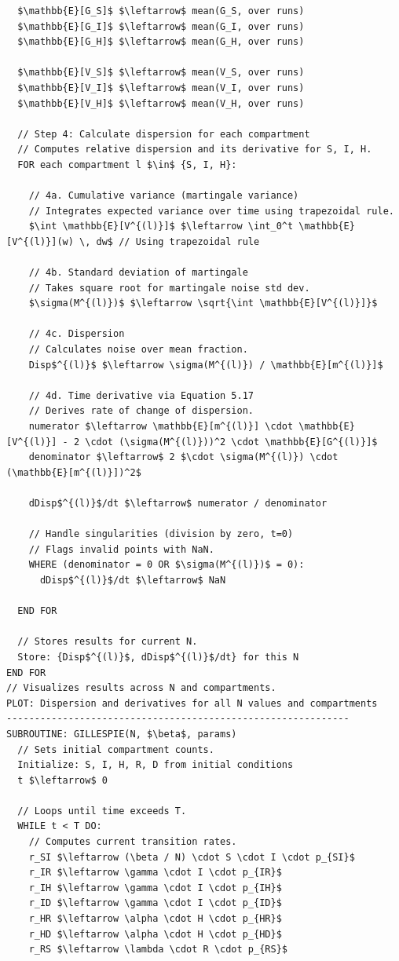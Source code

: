 \documentclass{article}
\begin{document}
\begin{lstlisting}
  $\mathbb{E}[G_S]$ $\leftarrow$ mean(G_S, over runs)
  $\mathbb{E}[G_I]$ $\leftarrow$ mean(G_I, over runs)
  $\mathbb{E}[G_H]$ $\leftarrow$ mean(G_H, over runs)
 
  $\mathbb{E}[V_S]$ $\leftarrow$ mean(V_S, over runs)
  $\mathbb{E}[V_I]$ $\leftarrow$ mean(V_I, over runs)
  $\mathbb{E}[V_H]$ $\leftarrow$ mean(V_H, over runs)
 
  // Step 4: Calculate dispersion for each compartment
  // Computes relative dispersion and its derivative for S, I, H.
  FOR each compartment l $\in$ {S, I, H}:
 
    // 4a. Cumulative variance (martingale variance)
    // Integrates expected variance over time using trapezoidal rule.
    $\int \mathbb{E}[V^{(l)}]$ $\leftarrow \int_0^t \mathbb{E}[V^{(l)}](w) \, dw$ // Using trapezoidal rule
   
    // 4b. Standard deviation of martingale
    // Takes square root for martingale noise std dev.
    $\sigma(M^{(l)})$ $\leftarrow \sqrt{\int \mathbb{E}[V^{(l)}]}$
   
    // 4c. Dispersion
    // Calculates noise over mean fraction.
    Disp$^{(l)}$ $\leftarrow \sigma(M^{(l)}) / \mathbb{E}[m^{(l)}]$
   
    // 4d. Time derivative via Equation 5.17
    // Derives rate of change of dispersion.
    numerator $\leftarrow \mathbb{E}[m^{(l)}] \cdot \mathbb{E}[V^{(l)}] - 2 \cdot (\sigma(M^{(l)}))^2 \cdot \mathbb{E}[G^{(l)}]$
    denominator $\leftarrow$ 2 $\cdot \sigma(M^{(l)}) \cdot (\mathbb{E}[m^{(l)}])^2$
   
    dDisp$^{(l)}$/dt $\leftarrow$ numerator / denominator
   
    // Handle singularities (division by zero, t=0)
    // Flags invalid points with NaN.
    WHERE (denominator = 0 OR $\sigma(M^{(l)})$ = 0):
      dDisp$^{(l)}$/dt $\leftarrow$ NaN
 
  END FOR
 
  // Stores results for current N.
  Store: {Disp$^{(l)}$, dDisp$^{(l)}$/dt} for this N
END FOR
// Visualizes results across N and compartments.
PLOT: Dispersion and derivatives for all N values and compartments
-------------------------------------------------------------
SUBROUTINE: GILLESPIE(N, $\beta$, params)
  // Sets initial compartment counts.
  Initialize: S, I, H, R, D from initial conditions
  t $\leftarrow$ 0
 
  // Loops until time exceeds T.
  WHILE t < T DO:
    // Computes current transition rates.
    r_SI $\leftarrow (\beta / N) \cdot S \cdot I \cdot p_{SI}$
    r_IR $\leftarrow \gamma \cdot I \cdot p_{IR}$
    r_IH $\leftarrow \gamma \cdot I \cdot p_{IH}$
    r_ID $\leftarrow \gamma \cdot I \cdot p_{ID}$
    r_HR $\leftarrow \alpha \cdot H \cdot p_{HR}$
    r_HD $\leftarrow \alpha \cdot H \cdot p_{HD}$
    r_RS $\leftarrow \lambda \cdot R \cdot p_{RS}$
   

\end{lstlisting}
\end{document}
